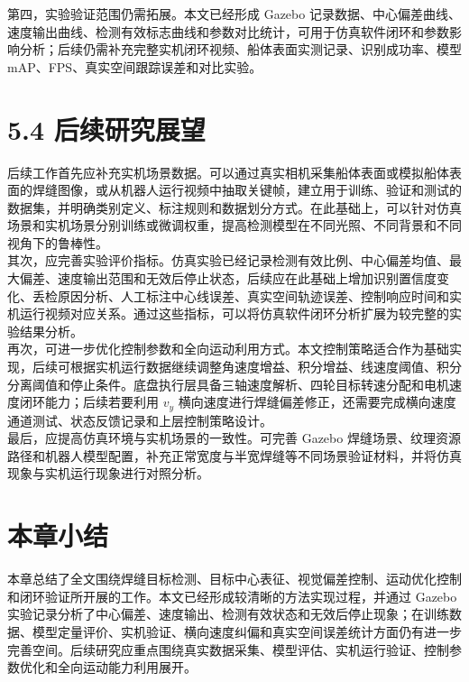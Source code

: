 \documentclass[UTF8,a4paper,12pt]{ctexrep}
\begin{document}
第四，实验验证范围仍需拓展。本文已经形成 Gazebo 记录数据、中心偏差曲线、速度输出曲线、检测有效标志曲线和参数对比统计，可用于仿真软件闭环和参数影响分析；后续仍需补充完整实机闭环视频、船体表面实测记录、识别成功率、模型 mAP、FPS、真实空间跟踪误差和对比实验。\\

\section{5.4 后续研究展望}

后续工作首先应补充实机场景数据。可以通过真实相机采集船体表面或模拟船体表面的焊缝图像，或从机器人运行视频中抽取关键帧，建立用于训练、验证和测试的数据集，并明确类别定义、标注规则和数据划分方式。在此基础上，可以针对仿真场景和实机场景分别训练或微调权重，提高检测模型在不同光照、不同背景和不同视角下的鲁棒性。\\

其次，应完善实验评价指标。仿真实验已经记录检测有效比例、中心偏差均值、最大偏差、速度输出范围和无效后停止状态，后续应在此基础上增加识别置信度变化、丢检原因分析、人工标注中心线误差、真实空间轨迹误差、控制响应时间和实机运行视频对应关系。通过这些指标，可以将仿真软件闭环分析扩展为较完整的实验结果分析。\\

再次，可进一步优化控制参数和全向运动利用方式。本文控制策略适合作为基础实现，后续可根据实机运行数据继续调整角速度增益、积分增益、线速度阈值、积分分离阈值和停止条件。底盘执行层具备三轴速度解析、四轮目标转速分配和电机速度闭环能力；后续若要利用 $v_y$ 横向速度进行焊缝偏差修正，还需要完成横向速度通道测试、状态反馈记录和上层控制策略设计。\\

最后，应提高仿真环境与实机场景的一致性。可完善 Gazebo 焊缝场景、纹理资源路径和机器人模型配置，补充正常宽度与半宽焊缝等不同场景验证材料，并将仿真现象与实机运行现象进行对照分析。\\

\section{本章小结}

本章总结了全文围绕焊缝目标检测、目标中心表征、视觉偏差控制、运动优化控制和闭环验证所开展的工作。本文已经形成较清晰的方法实现过程，并通过 Gazebo 实验记录分析了中心偏差、速度输出、检测有效状态和无效后停止现象；在训练数据、模型定量评价、实机验证、横向速度纠偏和真实空间误差统计方面仍有进一步完善空间。后续研究应重点围绕真实数据采集、模型评估、实机运行验证、控制参数优化和全向运动能力利用展开。\\
\end{document}
